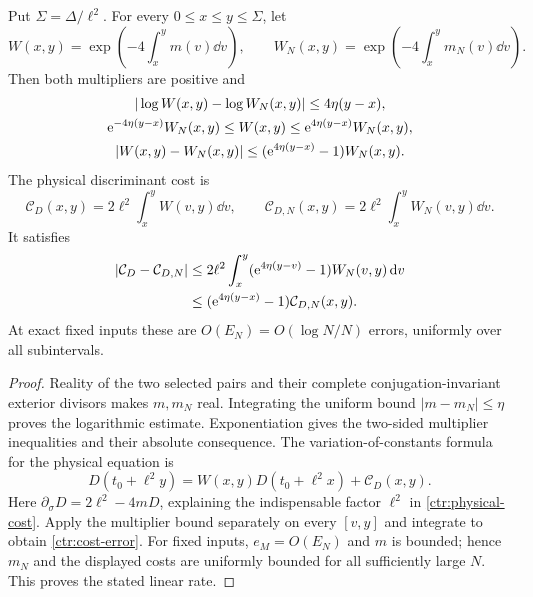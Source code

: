 \begin{theorem}
\label{ctr:transport-theorem}
Put $\Sigma=\Delta/\ell^2$. For every $0\le x\le y\le\Sigma$,
let
\begin{equation}
 W(x,y)=\exp\left(-4\int_x^y m(v)\dd v\right),\qquad
 W_N(x,y)=\exp\left(-4\int_x^y m_N(v)\dd v\right).
 \label{ctr:multipliers}
\end{equation}
Then both multipliers are positive and
\begin{equation}
 \begin{gathered}
 |\log W(x,y)-\log W_N(x,y)|\le4\eta(y-x),\\
 \mathrm e^{-4\eta(y-x)}W_N(x,y)\le W(x,y)
                 \le\mathrm e^{4\eta(y-x)}W_N(x,y),\\
 |W(x,y)-W_N(x,y)|\le(\mathrm e^{4\eta(y-x)}-1)W_N(x,y).
 \end{gathered}
 \label{ctr:multiplier-error}
\end{equation}
The physical discriminant cost is
\begin{equation}
 \mathcal C_D(x,y)=2\ell^2\int_x^yW(v,y)\dd v,
 \qquad
 \mathcal C_{D,N}(x,y)=2\ell^2\int_x^yW_N(v,y)\dd v.
 \label{ctr:physical-cost}
\end{equation}
It satisfies
\begin{equation}
 \begin{split}
 |\mathcal C_D-\mathcal C_{D,N}|
 &\le2\ell^2\int_x^y
             (\mathrm e^{4\eta(y-v)}-1)W_N(v,y)\,\mathrm d v\\
 &\le(\mathrm e^{4\eta(y-x)}-1)\mathcal C_{D,N}(x,y).
 \end{split}
 \label{ctr:cost-error}
\end{equation}
At exact fixed inputs these are $O(E_N)=O(\log N/N)$ errors,
uniformly over all subintervals.
\end{theorem}

\begin{proof}
Reality of the two selected pairs and their complete conjugation-invariant
exterior divisors makes $m,m_N$ real. Integrating the uniform bound
$|m-m_N|\le\eta$ proves the logarithmic estimate. Exponentiation gives
the two-sided multiplier inequalities and their absolute consequence.
The variation-of-constants formula for the physical equation is
\begin{equation}
 D(t_0+\ell^2y)
   =W(x,y)D(t_0+\ell^2x)+\mathcal C_D(x,y).
 \label{ctr:variation-constants}
\end{equation}
Here $\partial_\sigma D=2\ell^2-4mD$, explaining the indispensable
factor $\ell^2$ in \eqref{ctr:physical-cost}. Apply the multiplier
bound separately on every $[v,y]$ and integrate to obtain
\eqref{ctr:cost-error}. For fixed inputs, $e_M=O(E_N)$ and $m$ is
bounded; hence $m_N$ and the displayed costs are uniformly bounded
for all sufficiently large $N$. This proves the stated linear rate.
\end{proof}

